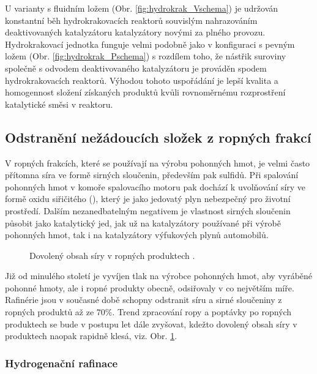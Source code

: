 \noindent
U varianty s fluidním ložem (Obr. \ref{fig:hydrokrak_Vschema}) je udržován konstantní běh hydrokrakovacích reaktorů souvislým nahrazováním deaktivovaných katalyzátoru katalyzátory novými za plného provozu. Hydrokrakovací jednotka funguje velmi podobně jako v konfiguraci s pevným ložem (Obr. \ref{fig:hydrokrak_Pschema}) s rozdílem toho, že nástřik suroviny společně s odvodem deaktivovaného katalyzátoru je prováděn spodem hydrokrakovacích reaktorů. Výhodou tohoto uspořádání je lepší kvalita a homogennost složení získaných produktů kvůli rovnoměrnému rozprostření katalytické směsi v reaktoru. \cite{Blazek2006,Prajapati2021}

\subsection{Odstranění nežádoucích složek z ropných frakcí}

V ropných frakcích, které se používají na výrobu pohonných hmot, je velmi často přítomna síra ve formě sirných sloučenin, především pak sulfidů. Při spalování pohonných hmot v komoře spalovacího motoru pak dochází k uvolňování síry ve formě oxidu siřičitého (), který je jako jedovatý plyn nebezpečný pro životní prostředí. Dalším nezanedbatelným negativem je vlastnost sirných sloučenin působit jako katalytický jed, jak už na katalyzátory používané při výrobě pohonných hmot, tak i na katalyzátory výfukových plynů automobilů. \cite{Blazek2006}
\begin{figure}[h]
    \centering
    
    \caption[Dovolený obsah síry v ropných produktech]{Dovolený obsah síry v ropných produktech \cite{IEAfuture}.}
    \label{fig:siravrope}
\end{figure}

\noindent
Již od minulého století je vyvíjen tlak na výrobce pohonných hmot, aby vyráběné pohonné hmoty, ale i ropné produkty obecně, odsiřovaly v co největším míře. Rafinérie jsou v současné době schopny odstranit síru a sirné sloučeniny z ropných produktů až ze $70\%$. Trend zpracování ropy a poptávky po ropných produktech se bude v postupu let dále zvyšovat, kdežto dovolený obsah síry v produktech naopak rapidně klesá, viz. Obr. \ref{fig:siravrope}. \cite{IEAfuture} 

\subsubsection{Hydrogenační rafinace}
\label{subsubsec:hydrogenr}

